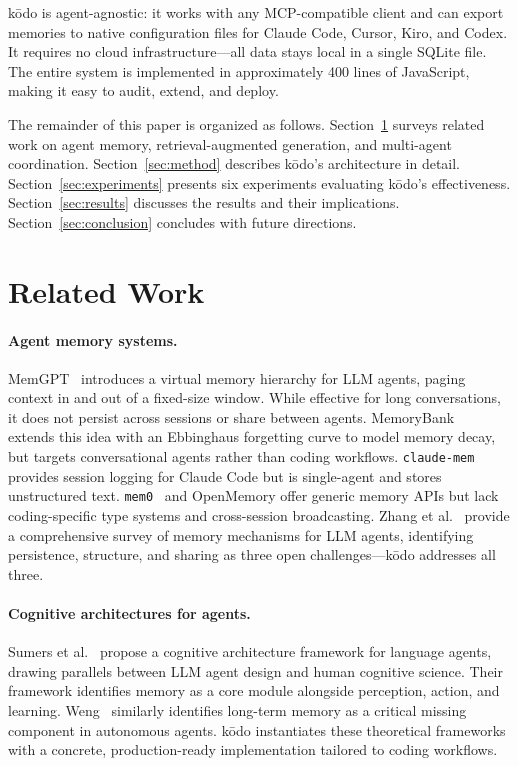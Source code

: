 \documentclass{article}
\begin{document}
k\=odo is agent-agnostic: it works with any MCP-compatible client and can export memories to native configuration files for Claude Code, Cursor, Kiro, and Codex. It requires no cloud infrastructure---all data stays local in a single SQLite file. The entire system is implemented in approximately 400 lines of JavaScript, making it easy to audit, extend, and deploy.

The remainder of this paper is organized as follows. Section~\ref{sec:related} surveys related work on agent memory, retrieval-augmented generation, and multi-agent coordination. Section~\ref{sec:method} describes k\=odo's architecture in detail. Section~\ref{sec:experiments} presents six experiments evaluating k\=odo's effectiveness. Section~\ref{sec:results} discusses the results and their implications. Section~\ref{sec:conclusion} concludes with future directions.

\section{Related Work}
\label{sec:related}

\paragraph{Agent memory systems.}
MemGPT~\cite{packer2023memgpt} introduces a virtual memory hierarchy for LLM agents, paging context in and out of a fixed-size window. While effective for long conversations, it does not persist across sessions or share between agents. MemoryBank~\cite{zhong2024memorybank} extends this idea with an Ebbinghaus forgetting curve to model memory decay, but targets conversational agents rather than coding workflows. \texttt{claude-mem} provides session logging for Claude Code but is single-agent and stores unstructured text. \texttt{mem0}~\cite{mem0} and OpenMemory offer generic memory APIs but lack coding-specific type systems and cross-session broadcasting. Zhang et al.~\cite{zhang2024survey} provide a comprehensive survey of memory mechanisms for LLM agents, identifying persistence, structure, and sharing as three open challenges---k\=odo addresses all three.

\paragraph{Cognitive architectures for agents.}
Sumers et al.~\cite{sumers2024cognitive} propose a cognitive architecture framework for language agents, drawing parallels between LLM agent design and human cognitive science. Their framework identifies memory as a core module alongside perception, action, and learning. Weng~\cite{weng2023agent} similarly identifies long-term memory as a critical missing component in autonomous agents. k\=odo instantiates these theoretical frameworks with a concrete, production-ready implementation tailored to coding workflows.
\end{document}
